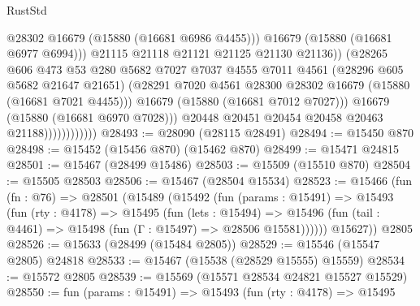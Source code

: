 \begin{lexlean}{RustStd}
\begin{coremodule}
                                      @28302
                                      @16679
                                      (@15880 (@16681 @6986 @4455)))
                                    @16679
                                    (@15880 (@16681 @6977 @6994)))
                                  @21115
                                  @21118
                                  @21121
                                  @21125
                                  @21130
                                  @21136))
                              (@28265
                                @606
                                @473
                                @53
                                @280
                                @5682
                                @7027
                                @7037
                                @4555
                                @7011
                                @4561
                                (@28296 @605 @5682 @21647 @21651)
                                (@28291
                                  @7020
                                  @4561
                                  @28300
                                  @28302
                                  @16679
                                  (@15880 (@16681 @7021 @4455)))
                                @16679
                                (@15880 (@16681 @7012 @7027)))
                              @16679
                              (@15880 (@16681 @6970 @7028)))
                            @20448
                            @20451
                            @20454
                            @20458
                            @20463
                            @21188))))))))))))
@28493 := @28090 (@28115 @28491)
@28494 := @15450 @870
@28498 := @15452 (@15456 @870) (@15462 @870)
@28499 := @15471 @24815
@28501 := @15467 (@28499 @15486)
@28503 := @15509 (@15510 @870)
@28504 := @15505 @28503
@28506 := @15467 (@28504 @15534)
@28523 := @15466
    (fun (fn : @76) =>
    @28501
      (@15489
        (@15492
          (fun (params : @15491) =>
          @15493
            (fun (rty : @4178) =>
            @15495
              (fun (lets : @15494) =>
              @15496 (fun (tail : @4461) => @15498 (fun (Γ : @15497) => @28506 @15581))))))
        @15627))
    @2805
@28526 := @15633 (@28499 (@15484 @2805))
@28529 := @15546 (@15547 @2805) @24818
@28533 := @15467 (@15538 (@28529 @15555) @15559)
@28534 := @15572 @2805
@28539 := @15569 (@15571 @28534 @24821 @15527 @15529)
@28550 := fun (params : @15491) =>
  @15493
    (fun (rty : @4178) =>
    @15495

\end{coremodule}
\end{lexlean}
